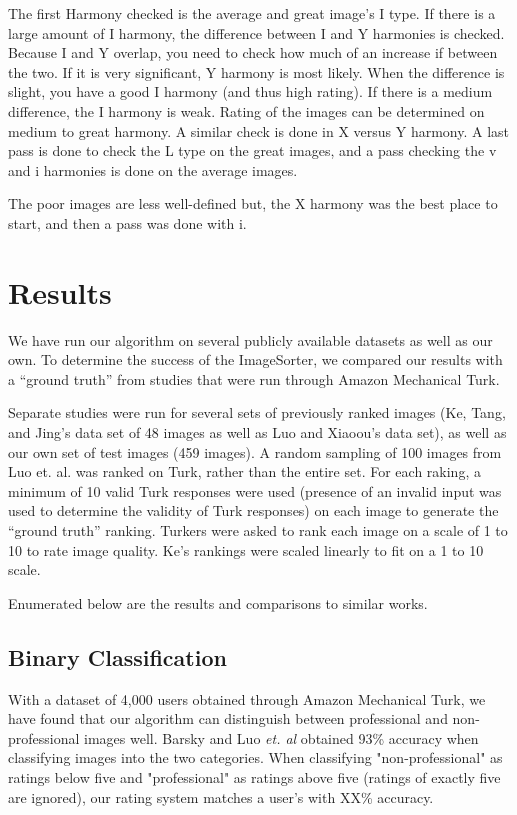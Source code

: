 \documentclass[twocolumn]{article}
\begin{document}
The first Harmony checked is the average and great image's I type. If there is a large amount of I harmony, the difference between I and Y harmonies is checked. Because I and Y overlap, you need to check how much of an increase if between the two. If it is very significant, Y harmony is most likely. When the difference is slight, you have a good I harmony (and thus high rating). If there is a medium difference, the I harmony is weak. Rating of the images can be determined on medium to great harmony. A similar check is done in X versus Y harmony. A last pass is done to check the L type on the great images, and a pass checking the v and i harmonies is done on the average images.

The poor images are less well-defined but, the X harmony was the best place to start, and then a pass was done with i.

\section{Results}
We have run our algorithm on several publicly available datasets as well as our own. To determine the success of the ImageSorter, we compared our results with a “ground truth” from studies that were run through Amazon Mechanical Turk.

Separate studies were run for several sets of previously ranked images (Ke, Tang, and Jing's data set of 48 images as well as Luo and Xiaoou's data set), as well as our own set of test images (459 images). A random sampling of 100 images from Luo et. al. was ranked on Turk, rather than the entire set. For each raking, a minimum of 10 valid Turk responses were used (presence of an invalid input was used to determine the validity of Turk responses) on each image to generate the “ground truth” ranking. Turkers were asked to rank each image on a scale of 1 to 10 to rate image quality. Ke's rankings were scaled linearly to fit on a 1 to 10 scale.

Enumerated below are the results and comparisons to similar works.

\subsection{Binary Classification} With a dataset of 4,000 users obtained through Amazon Mechanical Turk, we have found that our algorithm can distinguish between professional and non-professional images well. Barsky \cite{Yeh:2010:PPR:1873951.1873963} and Luo \emph{et. al}\cite{springerlink:10.1007/978-3-540-88690-7_29} obtained 93\% accuracy when classifying images into the two categories. When classifying "non-professional" as ratings below five and "professional" as ratings above five (ratings of exactly five are ignored), our rating system matches a user's with XX\% accuracy.
\end{document}
